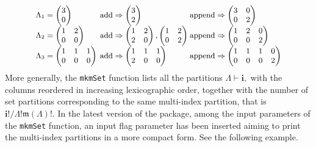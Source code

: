 \[{\small \begin{array}{lll}
\Lambda_1= \begin{pmatrix}
3 \\
0
\end{pmatrix} & \!\!\!\!\hbox{add} \Rightarrow \begin{pmatrix}
3 \\
2
\end{pmatrix}  & \!\!\!\!\!\hbox{append} \Rightarrow \begin{pmatrix}
3 & 0 \\
0 & 2
\end{pmatrix}\\
\Lambda_2= \begin{pmatrix}
1 & 2 \\
0 & 0
\end{pmatrix} &\!\!\!\!\hbox{add} \Rightarrow \begin{pmatrix}
1 & 2 \\
2 & 0
\end{pmatrix}, \begin{pmatrix}
1 & 2 \\
0 & 2
\end{pmatrix} & \!\!\!\!\!\hbox{append} \Rightarrow \begin{pmatrix}
1 & 2 & 0\\
0 & 0 & 2
\end{pmatrix} \\
\Lambda_3=\begin{pmatrix}
1 & 1 & 1 \\
0 & 0 & 0
\end{pmatrix} & \!\!\!\!\hbox{add} \Rightarrow \begin{pmatrix}
1 & 1 & 1 \\
2 & 0 & 0
\end{pmatrix} &  \!\!\!\!\!\hbox{append} \Rightarrow \begin{pmatrix}
1 & 1 & 1 & 0 \\
0 & 0 & 0 & 2
\end{pmatrix} 
\end{array}}\]
More generally, the \texttt{mkmSet} function lists all the partitions \(\Lambda \vdash \boldsymbol{i},\) with the columns reordered in increasing lexicographic order, together with
the number of set partitions corresponding to the same multi-index partition, that is \(\boldsymbol{i}!/\Lambda! \mathfrak{m}(\Lambda)!.\) In the latest version of the  package, among the input parameters of the \texttt{mkmSet} function, an input flag parameter has been inserted aiming to print the multi-index partitions in a more compact form. See the following example.

